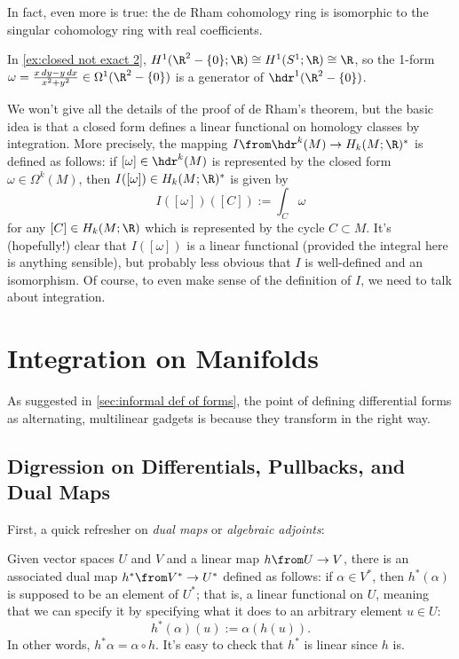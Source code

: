 In fact, even more is true: the de Rham cohomology ring is isomorphic to the singular cohomology ring with real coefficients.

In \cref{ex:closed not exact 2}, $H^1(\R^2 -\{0\};\R) \cong H^1(S^1;\R) \cong \R$, so the 1-form $\omega = \frac{x\, dy - y\, dx}{x^2 + y^2} \in \Omega^1(\R^2 -\{0\})$ is a generator of $\hdr^1(\R^2-\{0\})$.

We won't give all the details of the proof of de Rham's theorem, but the basic idea is that a closed form defines a linear functional on homology classes by integration. More precisely, the mapping $I \from \hdr^k(M) \to H_k(M;\R)^\ast$ is defined as follows: if $[\omega] \in \hdr^k(M)$ is represented by the closed form $\omega \in \Omega^k(M)$, then $I([\omega]) \in H_k(M;\R)^\ast$ is given by
\[
	I([\omega])([C]) := \int_C \omega
\]
for any $[C] \in H_k(M;\R)$ which is represented by the cycle $C \subset M$. It's (hopefully!) clear that $I([\omega])$ is a linear functional (provided the integral here is anything sensible), but probably less obvious that $I$ is well-defined and an isomorphism. Of course, to even make sense of the definition of $I$, we need to talk about integration.

\section{Integration on Manifolds}
\label{sec:integration_on_manifolds}

As suggested in \cref{sec:informal def of forms}, the point of defining differential forms as alternating, multilinear gadgets is because they transform in the right way. 

\subsection{Digression on Differentials, Pullbacks, and Dual Maps} 
\label{sub:digression_on_differentials_pullbacks_and_dual_maps}

First, a quick refresher on \emph{dual maps} or \emph{algebraic adjoints}:

Given vector spaces $U$ and $V$ and a linear map $h \from U \to V$, there is an associated dual map $h^\ast \from V^\ast \to U^\ast$ defined as follows: if $\alpha \in V^\ast$, then $h^\ast(\alpha)$ is supposed to be an element of $U^\ast$; that is, a linear functional on $U$, meaning that we can specify it by specifying what it does to an arbitrary element $u \in U$:
\[
	h^\ast(\alpha)(u) := \alpha(h(u)).
\]
In other words, $h^\ast \alpha = \alpha \circ h$. It's easy to check that $h^\ast$ is linear since $h$ is.

